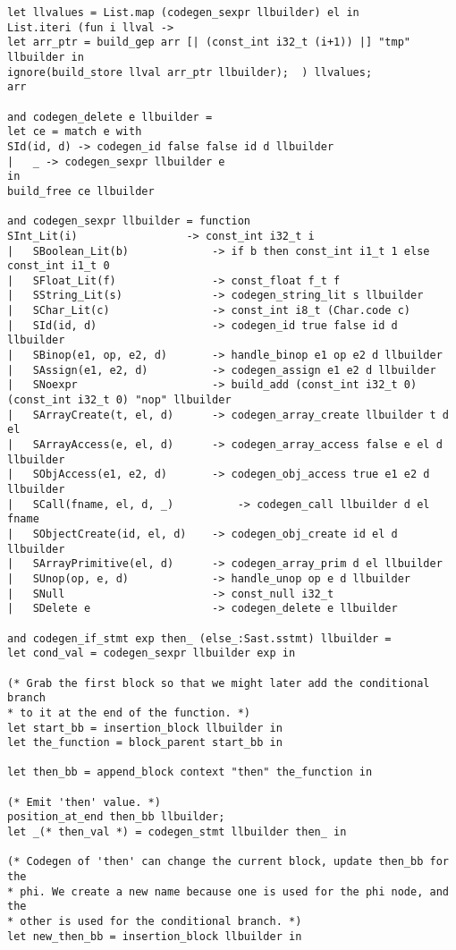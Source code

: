 \begin{verbatim}
let llvalues = List.map (codegen_sexpr llbuilder) el in
List.iteri (fun i llval -> 
let arr_ptr = build_gep arr [| (const_int i32_t (i+1)) |] "tmp" llbuilder in
ignore(build_store llval arr_ptr llbuilder);  ) llvalues;
arr

and codegen_delete e llbuilder =
let ce = match e with
SId(id, d) -> codegen_id false false id d llbuilder
| 	_ -> codegen_sexpr llbuilder e
in
build_free ce llbuilder

and codegen_sexpr llbuilder = function
SInt_Lit(i)            		-> const_int i32_t i
|   SBoolean_Lit(b)        		-> if b then const_int i1_t 1 else const_int i1_t 0
|   SFloat_Lit(f)          		-> const_float f_t f 
|   SString_Lit(s)         		-> codegen_string_lit s llbuilder
|   SChar_Lit(c)           		-> const_int i8_t (Char.code c)
|   SId(id, d)                	-> codegen_id true false id d llbuilder
|   SBinop(e1, op, e2, d)     	-> handle_binop e1 op e2 d llbuilder
|   SAssign(e1, e2, d)        	-> codegen_assign e1 e2 d llbuilder
|   SNoexpr                 	-> build_add (const_int i32_t 0) (const_int i32_t 0) "nop" llbuilder
|   SArrayCreate(t, el, d)    	-> codegen_array_create llbuilder t d el
|   SArrayAccess(e, el, d)    	-> codegen_array_access false e el d llbuilder
|   SObjAccess(e1, e2, d)     	-> codegen_obj_access true e1 e2 d llbuilder
|   SCall(fname, el, d, _)       	-> codegen_call llbuilder d el fname		
|   SObjectCreate(id, el, d)  	-> codegen_obj_create id el d llbuilder
|   SArrayPrimitive(el, d)    	-> codegen_array_prim d el llbuilder 
|   SUnop(op, e, d)           	-> handle_unop op e d llbuilder
|   SNull          	        	-> const_null i32_t
| 	SDelete e 				 	-> codegen_delete e llbuilder

and codegen_if_stmt exp then_ (else_:Sast.sstmt) llbuilder =
let cond_val = codegen_sexpr llbuilder exp in

(* Grab the first block so that we might later add the conditional branch
* to it at the end of the function. *)
let start_bb = insertion_block llbuilder in
let the_function = block_parent start_bb in

let then_bb = append_block context "then" the_function in

(* Emit 'then' value. *)
position_at_end then_bb llbuilder;
let _(* then_val *) = codegen_stmt llbuilder then_ in

(* Codegen of 'then' can change the current block, update then_bb for the
* phi. We create a new name because one is used for the phi node, and the
* other is used for the conditional branch. *)
let new_then_bb = insertion_block llbuilder in


\end{verbatim}
